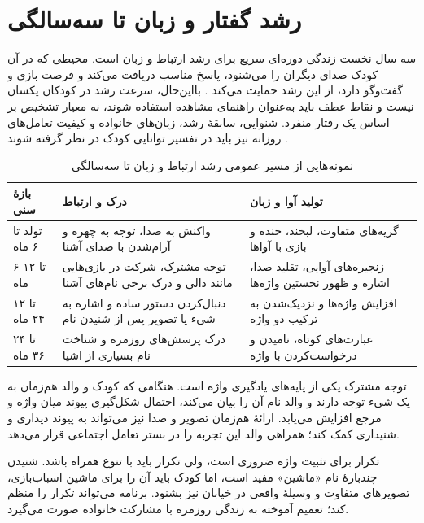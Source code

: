 \section{رشد گفتار و زبان تا سه‌سالگی}

سه سال نخست زندگی دوره‌ای سریع برای رشد ارتباط و زبان است. محیطی که در آن کودک صدای دیگران را می‌شنود، پاسخ مناسب دریافت می‌کند و فرصت بازی و گفت‌وگو دارد، از این رشد حمایت می‌کند \cite{NIDCDMilestones2022}. بااین‌حال، سرعت رشد در کودکان یکسان نیست و نقاط عطف باید به‌عنوان راهنمای مشاهده استفاده شوند، نه معیار تشخیص بر اساس یک رفتار منفرد. شنوایی، سابقهٔ رشد، زبان‌های خانواده و کیفیت تعامل‌های روزانه نیز باید در تفسیر توانایی کودک در نظر گرفته شوند \cite{ASHAMilestones2024}.

\begin{table}[ht]
\centering
\caption{نمونه‌هایی از مسیر عمومی رشد ارتباط و زبان تا سه‌سالگی \cite{NIDCDMilestones2022,ASHAMilestones2024}}
\label{tab:language-milestones}
\renewcommand{\arraystretch}{1.25}
\begin{tabular}{|p{}|p{}|p{}|}
\hline
\textbf{بازهٔ سنی} & \textbf{درک و ارتباط} & \textbf{تولید آوا و زبان} \\
\hline
تولد تا ۶ ماه & واکنش به صدا، توجه به چهره و آرام‌شدن با صدای آشنا & گریه‌های متفاوت، لبخند، خنده و بازی با آواها \\
\hline
۶ تا ۱۲ ماه & توجه مشترک، شرکت در بازی‌هایی مانند دالی و درک برخی نام‌های آشنا & زنجیره‌های آوایی، تقلید صدا، اشاره و ظهور نخستین واژه‌ها \\
\hline
۱۲ تا ۲۴ ماه & دنبال‌کردن دستور ساده و اشاره به شیء یا تصویر پس از شنیدن نام & افزایش واژه‌ها و نزدیک‌شدن به ترکیب دو واژه \\
\hline
۲۴ تا ۳۶ ماه & درک پرسش‌های روزمره و شناخت نام بسیاری از اشیا & عبارت‌های کوتاه، نامیدن و درخواست‌کردن با واژه \\
\hline
\end{tabular}
\end{table}

توجه مشترک یکی از پایه‌های یادگیری واژه است. هنگامی که کودک و والد هم‌زمان به یک شیء توجه دارند و والد نام آن را بیان می‌کند، احتمال شکل‌گیری پیوند میان واژه و مرجع افزایش می‌یابد. ارائهٔ هم‌زمان تصویر و صدا نیز می‌تواند به پیوند دیداری و شنیداری کمک کند؛ همراهی والد این تجربه را در بستر تعامل اجتماعی قرار می‌دهد.

تکرار برای تثبیت واژه ضروری است، ولی تکرار باید با تنوع همراه باشد. شنیدن چندبارهٔ نام «ماشین» مفید است، اما کودک باید آن را برای ماشین اسباب‌بازی، تصویرهای متفاوت و وسیلهٔ واقعی در خیابان نیز بشنود. برنامه می‌تواند تکرار را منظم کند؛ تعمیم آموخته به زندگی روزمره با مشارکت خانواده صورت می‌گیرد.

